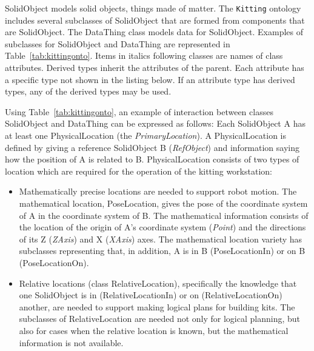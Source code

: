 \textsf{SolidObject} models solid objects, things made of matter. The \texttt{Kitting} ontology includes several subclasses of \textsf{SolidObject} that are formed from
components that are \textsf{SolidObject}. The \textsf{DataThing} class models data for \textsf{SolidObject}. Examples of subclasses for \textsf{SolidObject} and \textsf{DataThing} are represented in Table~\ref{tab:kittingonto}. Items in italics following classes are names of class attributes. Derived types inherit the attributes of the parent. Each attribute has a specific type not shown in the listing below. If an attribute type has derived types, any of the derived types may be used.

Using Table~\ref{tab:kittingonto}, an example of interaction between classes \textsf{SolidObject} and \textsf{DataThing} can be expressed as follows: Each \textsf{SolidObject} \textsf{A} has at least one \textsf{PhysicalLocation} (the \textit{PrimaryLocation}). A \textsf{PhysicalLocation} is defined by giving a reference \textsf{SolidObject} \textsf{B} (\textit{RefObject}) and information saying how the position of \textsf{A} is related to \textsf{B}. \textsf{PhysicalLocation} consists of two types of location which are required for the operation of the kitting workstation:
\begin{itemize}
 \item Mathematically precise locations are needed to support robot motion. The mathematical location, \textsf{PoseLocation}, gives the pose of the coordinate system of \textsf{A} in the coordinate system of \textsf{B}. The mathematical information consists of the location of the origin of \textsf{A}'s coordinate system (\textit{Point}) and the directions of its Z (\textit{ZAxis}) and X (\textit{XAxis}) axes. The mathematical location variety has subclasses representing that, in addition, \textsf{A} is in \textsf{B} (\textsf{PoseLocationIn}) or on \textsf{B} (\textsf{PoseLocationOn}).
\item Relative locations (class \textsf{RelativeLocation}), specifically the knowledge that one \textsf{SolidObject} is in (\textsf{RelativeLocationIn}) or on (\textsf{RelativeLocationOn}) another, are needed to support making logical plans for building kits. The subclasses of \textsf{RelativeLocation} are needed not only for
logical planning, but also for cases when the relative location is known, but the
mathematical information is not available.
\end{itemize}




